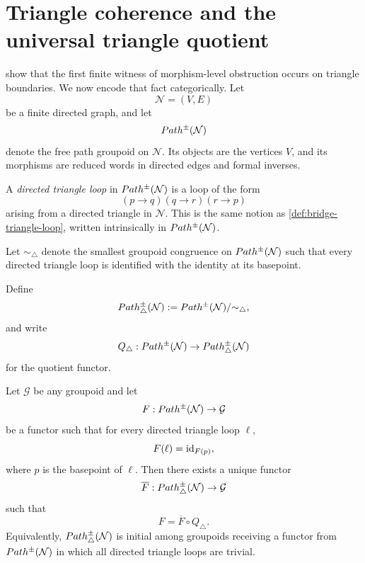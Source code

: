 \section{Triangle coherence and the universal triangle quotient}
 show that the first
finite witness of
morphism-level obstruction occurs on triangle boundaries.  We now
encode that fact categorically.
Let
\[
	\mathcal N=(V,E)
\]
be a finite directed graph, and let
\[
	Path^\pm(\mathcal N)
\]
denote the free path groupoid on \(\mathcal N\).  Its objects are the
vertices \(V\), and its morphisms are reduced words in directed edges
and formal inverses.
\begin{definition}
	A \emph{directed triangle loop} in \(Path^\pm(\mathcal N)\) is a loop
	of the form
	\[
		(p\to q)(q\to r)(r\to p)
	\]
	arising from a directed triangle in \(\mathcal N\). This is the same notion
	as \cref{def:bridge-triangle-loop}, written intrinsically in
	\(Path^\pm(\mathcal N)\).
\end{definition}
\begin{definition}
	Let \(\sim_\triangle\) denote the smallest groupoid congruence on
	\(Path^\pm(\mathcal N)\) such that every directed triangle loop is
	identified with the identity at its basepoint.
\end{definition}
\begin{definition}
	Define
	\[
		Path^\pm_\triangle(\mathcal N)
		:=
		Path^\pm(\mathcal N)/{\sim_\triangle},
	\]
	and write
	\[
		Q_\triangle:Path^\pm(\mathcal N)\to Path^\pm_\triangle(\mathcal N)
	\]
	for the quotient functor.
\end{definition}
\begin{theorem}
	\label{thm:triangle-quotient-universal}
	Let \(\mathcal G\) be any groupoid and let
	\[
		F:Path^\pm(\mathcal N)\to\mathcal G
	\]
	be a functor such that for every directed triangle loop \(\ell\),
	\[
		F(\ell)=\operatorname{id}_{F(p)},
	\]
	where \(p\) is the basepoint of \(\ell\).  Then there exists a unique
	functor
	\[
		\overline F:Path^\pm_\triangle(\mathcal N)\to \mathcal G
	\]
	such that
	\[
		F=\overline F\circ Q_\triangle.
	\]
	Equivalently, \(Path^\pm_\triangle(\mathcal N)\) is initial among
	groupoids receiving a functor from \(Path^\pm(\mathcal N)\) in which
	all directed triangle loops are trivial.
\end{theorem}

